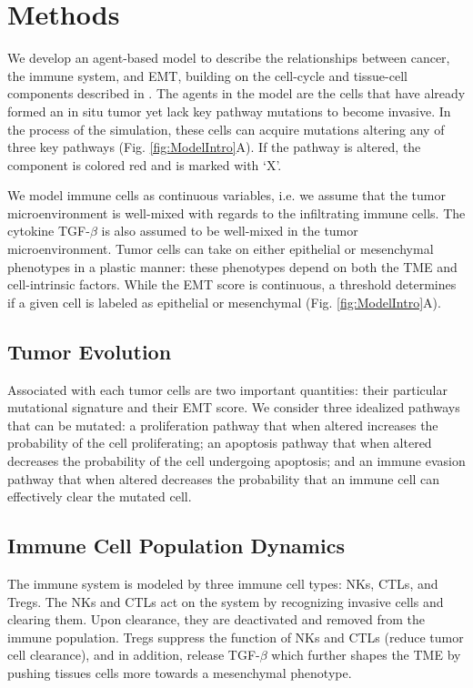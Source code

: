 \documentclass[11pt]{article}
\begin{document}
\section{Methods}
We develop an agent-based model to describe the relationships between cancer, the immune system, and EMT, building on the cell-cycle and tissue-cell components described in \cite{guo17_multiscale}. 
The agents in the model are the cells that have already formed an in situ tumor yet lack key pathway mutations to become invasive.
In the process of the simulation, these cells can acquire mutations altering any of three key pathways (Fig. \ref{fig:ModelIntro}A).
If the pathway is altered, the component is colored red and is marked with `X'.
\par
We model immune cells as continuous variables, i.e. we assume that the tumor microenvironment is well-mixed with regards to the infiltrating immune cells.
The cytokine TGF-$\beta$ is also assumed to be well-mixed in the tumor microenvironment.
Tumor cells can take on either epithelial or mesenchymal phenotypes in a plastic manner: these phenotypes depend on both the TME and cell-intrinsic factors.
While the EMT score is continuous, a threshold determines if a given cell is labeled as epithelial or mesenchymal (Fig. \ref{fig:ModelIntro}A).

\subsection{Tumor Evolution}\label{TissueCells}
Associated with each tumor cells are two important quantities: their particular mutational signature and their EMT score. We consider three idealized pathways that can be mutated: a proliferation pathway that when altered increases the probability of the cell proliferating; an apoptosis pathway that when altered decreases the probability of the cell undergoing apoptosis; and an immune evasion pathway that when altered decreases the probability that an immune cell can effectively clear the mutated cell.
 
\subsection{Immune Cell Population Dynamics}\label{ImmuneSystem}
The immune system is modeled by three immune cell types: NKs, CTLs, and Tregs.
The NKs and CTLs act on the system by recognizing invasive cells and clearing them.
Upon clearance, they are deactivated and removed from the immune population.
Tregs suppress the function of NKs and CTLs (reduce tumor cell clearance), and in addition, release TGF-$\beta$ which further shapes the TME by pushing tissues cells more towards a mesenchymal phenotype.
\end{document}
